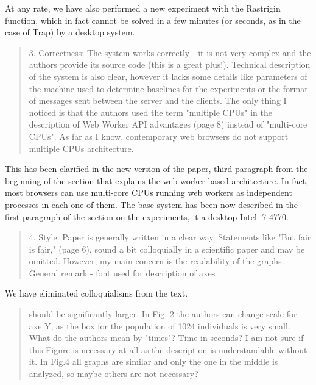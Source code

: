 \documentclass[preprint]{elsarticle}
\begin{document}
At any rate, we have also performed a new experiment with the
Rastrigin function, which in fact cannot be solved in a few minutes
(or seconds, as in the case of Trap) by a desktop system. 



\begin{quote}
3. Correctness: The system works correctly - it is not very complex and the authors provide its source
code (this is a great plus!). Technical description of the system is also clear, however it lacks some
details like parameters of the machine used to determine baselines for the experiments or the format of
messages sent between the server and the clients. The only thing I noticed is that the authors used the
term "multiple CPUs" in the description of Web Worker API advantages (page 8) instead of "multi-core
CPUs". As far as I know, contemporary web browsers do not support
multiple CPUs architecture.
\end{quote}

This has been clarified in the new version of the paper, third
paragraph from the beginning of the section that explains the web
worker-based architecture. In fact, most browsers can use multi-core
CPUs running web workers as independent processes in each one of them.
The base system has been now described in the first paragraph of the
section on the experiments, it a desktop Intel i7-4770. 

\begin{quote}

4. Style: Paper is generally written in a clear way. Statements like
"But fair is fair," (page 6), sound a bit colloquially in a scientific
paper and may be omitted. However, my main concern is the readability
of the graphs. General remark - font used for description of axes

\end{quote}

We have eliminated colloquialisms from the text.

\begin{quote}
should be significantly larger. In Fig. 2 the authors can change scale
for axe Y, as the box for the population of 1024 individuals is very
small.  What do the authors mean by "times"? Time in seconds? I am not
sure if this Figure is necessary at all as the description is
understandable without it. In Fig.4 all graphs are similar and only
the one in the middle is analyzed, so maybe others are not necessary?
\end{quote}
\end{document}
